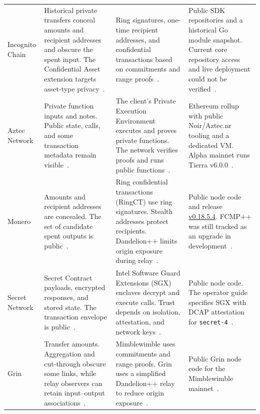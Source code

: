 \begin{longtable}{>{\raggedright\arraybackslash}m{}>{\raggedright\arraybackslash}m{}>{\raggedright\arraybackslash}m{}>{\raggedright\arraybackslash}m{}}
\addlinespace[3pt]
Incognito Chain & Historical private transfers conceal amounts and recipient addresses and obscure the spent input. The Confidential Asset extension targets asset-type privacy~\cite{platform-incognito-core}. & Ring signatures, one-time recipient addresses, and confidential transactions based on commitments and range proofs~\cite{platform-incognito-design,platform-incognito-core}. & Public SDK repositories and a historical Go module snapshot. Current core repository access and live deployment could not be verified~\cite{platform-incognito-repositories,platform-incognito-core}. \\
\addlinespace[3pt]
Aztec Network & Private function inputs and notes. Public state, calls, and some transaction metadata remain visible~\cite{platform-aztec-docs,platform-aztec-limits}. & The client's Private Execution Environment executes and proves private functions. The network verifies proofs and runs public functions~\cite{platform-aztec-docs}. & Ethereum rollup with public Noir/Aztec.nr tooling and a dedicated VM. Alpha mainnet runs Tierra v6.0.0~\cite{platform-aztec-code,platform-aztec-status}. \\
\addlinespace[3pt]
Monero & Amounts and recipient addresses are concealed. The set of candidate spent outputs is public~\cite{platform-monero-privacy}. & Ring confidential transactions (RingCT) use ring signatures. Stealth addresses protect recipients. Dandelion++ limits origin exposure during relay~\cite{platform-monero-privacy}. & Public node code and release \href{https://github.com/monero-project/monero/releases/tag/v0.18.5.4}{v0.18.5.4}. FCMP++ was still tracked as an upgrade in development~\cite{platform-monero-code,platform-monero-fcmp-milestone}. \\
\addlinespace[3pt]
Secret Network & Secret Contract payloads, encrypted responses, and stored state. The transaction envelope is public~\cite{platform-secret-transactions,platform-secret-inputs}. & Intel Software Guard Extensions (SGX) enclaves decrypt and execute calls. Trust depends on isolation, attestation, and network keys~\cite{platform-secret-transactions,platform-secret-operators2026}. & Public node code. The operator guide specifies SGX with DCAP attestation for \texttt{secret-4}~\cite{platform-secret-code,platform-secret-operators2026}. \\
\addlinespace[3pt]
Grin & Transfer amounts. Aggregation and cut-through obscure some links, while relay observers can retain input--output associations~\cite{platform-grin-privacy}. & Mimblewimble uses commitments and range proofs. Grin uses a simplified Dandelion++ relay to reduce origin exposure~\cite{platform-grin-privacy,platform-grin-relay}. & Public Grin node code for the Mimblewimble mainnet~\cite{platform-grin-code}. \\

\end{longtable}
